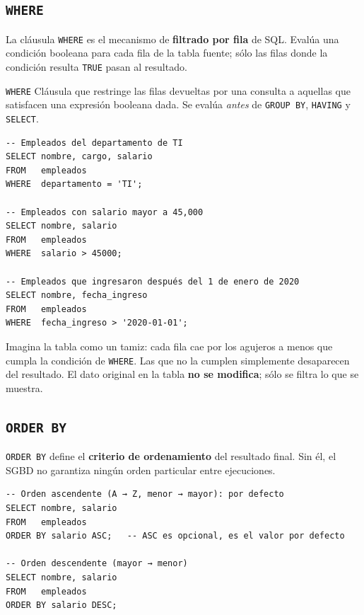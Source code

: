 \subsection{\texttt{WHERE}}

La cláusula \texttt{WHERE} es el mecanismo de \textbf{filtrado por
fila} de SQL.
Evalúa una condición booleana para cada fila de la tabla fuente;
sólo las filas donde la condición resulta \texttt{TRUE} pasan al
resultado.

\begin{definicion}{\texttt{WHERE}}
Cláusula que restringe las filas devueltas por una consulta a
aquellas que satisfacen una expresión booleana dada.
Se evalúa \textit{antes} de \texttt{GROUP BY}, \texttt{HAVING} y
\texttt{SELECT}.
\end{definicion}

\begin{lstlisting}[caption={Filtros básicos con WHERE.}]
-- Empleados del departamento de TI
SELECT nombre, cargo, salario
FROM   empleados
WHERE  departamento = 'TI';

-- Empleados con salario mayor a 45,000
SELECT nombre, salario
FROM   empleados
WHERE  salario > 45000;

-- Empleados que ingresaron después del 1 de enero de 2020
SELECT nombre, fecha_ingreso
FROM   empleados
WHERE  fecha_ingreso > '2020-01-01';
\end{lstlisting}

\begin{ejemplo}
Imagina la tabla como un tamiz: cada fila cae por los agujeros a
menos que cumpla la condición de \texttt{WHERE}.
Las que no la cumplen simplemente desaparecen del resultado.
El dato original en la tabla \textbf{no se modifica}; sólo se
filtra lo que se muestra.
\end{ejemplo}

\subsection{\texttt{ORDER BY}}

\texttt{ORDER BY} define el \textbf{criterio de ordenamiento} del
resultado final.
Sin él, el SGBD no garantiza ningún orden particular entre
ejecuciones.

\begin{lstlisting}[caption={Orden ascendente y descendente.}]
-- Orden ascendente (A → Z, menor → mayor): por defecto
SELECT nombre, salario
FROM   empleados
ORDER BY salario ASC;   -- ASC es opcional, es el valor por defecto

-- Orden descendente (mayor → menor)
SELECT nombre, salario
FROM   empleados
ORDER BY salario DESC;
\end{lstlisting}

